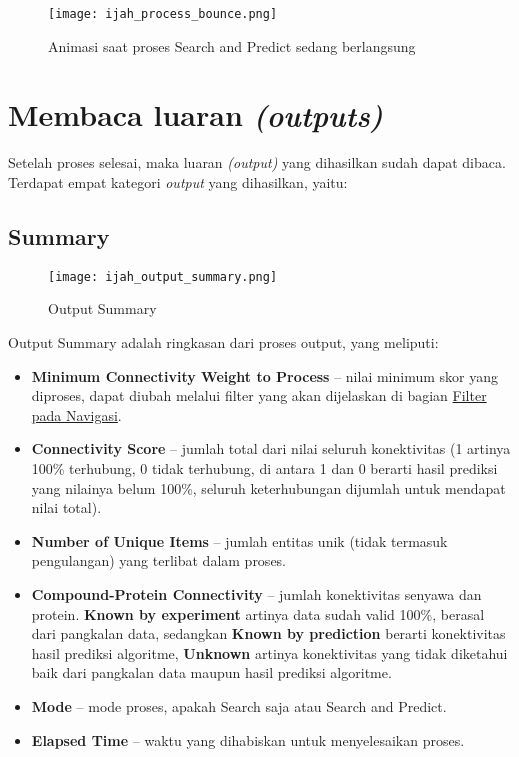 \begin{figure}[H]
	\centering
	\texttt{[image: ijah\_process\_bounce.png]}
	\caption{Animasi saat proses Search and Predict sedang berlangsung}
	\label{fig:ijah_process_bounce}
	\end{figure}

\section{Membaca luaran \emph{(outputs)}}
Setelah proses selesai, maka luaran \emph{(output)} yang dihasilkan sudah dapat dibaca. Terdapat empat kategori \emph{output} yang dihasilkan, yaitu:
	
	\subsection{Summary} \label{summary}
	\begin{figure}[H]
	\centering
	\texttt{[image: ijah\_output\_summary.png]}
	\caption{Output Summary}
	\label{fig:ijah_output_summary}
	\end{figure}
	
	Output Summary adalah ringkasan dari proses output, yang meliputi:
	\begin{itemize}
	\item \textbf{Minimum Connectivity Weight to Process} -- nilai minimum skor yang diproses, dapat diubah melalui filter yang akan dijelaskan di bagian \hyperref[nav]{Filter pada Navigasi}.
	\item \textbf{Connectivity Score} -- jumlah total dari nilai seluruh konektivitas (1 artinya 100\% terhubung, 0 tidak terhubung, di antara 1 dan 0 berarti hasil prediksi yang nilainya belum 100\%, seluruh keterhubungan dijumlah untuk mendapat nilai total).
	\item \textbf{Number of Unique Items} -- jumlah entitas unik (tidak termasuk pengulangan) yang terlibat dalam proses.
	\item \textbf{Compound-Protein Connectivity} -- jumlah konektivitas senyawa dan protein. \textbf{Known by experiment} artinya data sudah valid 100\%, berasal dari pangkalan data, sedangkan \textbf{Known by prediction} berarti konektivitas hasil prediksi algoritme, \textbf{Unknown} artinya konektivitas yang tidak diketahui baik dari pangkalan data maupun hasil prediksi algoritme.
	\item \textbf{Mode} -- mode proses, apakah Search saja atau Search and Predict.
	\item \textbf{Elapsed Time} -- waktu yang dihabiskan untuk menyelesaikan proses.
	\end{itemize}
	
